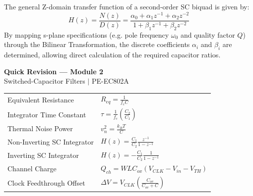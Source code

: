 \documentclass[12pt,a4paper]{article}
\renewcommand{\arraystretch}{1.45}
\begin{document}
The general Z-domain transfer function of a second-order SC biquad is given by:
\[
H(z) = \frac{N(z)}{D(z)} = \frac{\alpha_0 + \alpha_1 z^{-1} + \alpha_2 z^{-2}}{1 + \beta_1 z^{-1} + \beta_2 z^{-2}}
\]
By mapping s-plane specifications (e.g. pole frequency $\omega_0$ and quality factor $Q$) through the Bilinear Transformation, the discrete coefficients $\alpha_i$ and $\beta_i$ are determined, allowing direct calculation of the required capacitor ratios.

\newpage
\begin{center}
  {\large\bfseries\color{myred} Quick Revision --- Module 2}\\[3pt]
  {\small\color{mydark} Switched-Capacitor Filters $|$ PE-EC802A}
\end{center}
\noindent{\color{myred}\rule{\linewidth}{1.2pt}}
\vspace{4pt}

\begin{tcolorbox}[formulabox, title={\textbf{Key Formulas at a Glance}}]
\renewcommand{\arraystretch}{1.35}
\begin{tabularx}{\linewidth}{B{5.0cm} X}
Equivalent Resistance & $R_{eq} = \frac{1}{f_c C}$ \\[4pt]
Integrator Time Constant & $\tau = \frac{1}{f_c} \left( \frac{C_2}{C_1} \right)$ \\[4pt]
Thermal Noise Power & $v_n^2 = \frac{k_B T}{C}$ \\[4pt]
Non-Inverting SC Integrator & $H(z) = \frac{C_1}{C_2} \frac{z^{-1}}{1 - z^{-1}}$ \\[4pt]
Inverting SC Integrator & $H(z) = -\frac{C_1}{C_2} \frac{1}{1 - z^{-1}}$ \\[4pt]
Channel Charge & $Q_{ch} = W L C_{ox}(V_{CLK} - V_{in} - V_{TH})$ \\[4pt]
Clock Feedthrough Offset & $\Delta V = V_{CLK} \left( \frac{C_{ov}}{C_{ov} + C} \right)$ \\
\end{tabularx}
\end{tcolorbox}
\end{document}
